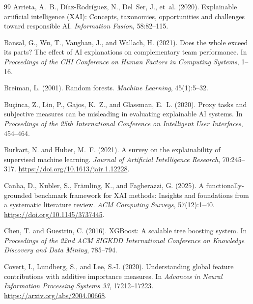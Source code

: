 \documentclass[twoside,11pt]{article}
\begin{document}
\begin{thebibliography}{99}
Arrieta, A.~B., D\'{i}az-Rodr\'{i}guez, N., Del~Ser, J., et~al. (2020).
Explainable artificial intelligence (XAI): Concepts, taxonomies,
opportunities and challenges toward responsible AI.
\emph{Information Fusion}, 58:82--115.

Bansal, G., Wu, T., Vaughan, J., and Wallach, H. (2021).
Does the whole exceed its parts? The effect of AI explanations on
complementary team performance.
In \emph{Proceedings of the CHI Conference on Human Factors in Computing
Systems}, 1--16.

Breiman, L. (2001).
Random forests.
\emph{Machine Learning}, 45(1):5--32.

Bu\c{c}inca, Z., Lin, P., Gajos, K.~Z., and Glassman, E.~L. (2020).
Proxy tasks and subjective measures can be misleading in evaluating
explainable AI systems.
In \emph{Proceedings of the 25th International Conference on Intelligent
User Interfaces}, 454--464.

Burkart, N. and Huber, M.~F. (2021).
A survey on the explainability of supervised machine learning.
\emph{Journal of Artificial Intelligence Research}, 70:245--317.
\url{https://doi.org/10.1613/jair.1.12228}.

Canha, D., Kubler, S., Fr\"{a}mling, K., and Fagherazzi, G. (2025).
A functionally-grounded benchmark framework for XAI methods: Insights
and foundations from a systematic literature review.
\emph{ACM Computing Surveys}, 57(12):1--40.
\url{https://doi.org/10.1145/3737445}.

Chen, T. and Guestrin, C. (2016).
XGBoost: A scalable tree boosting system.
In \emph{Proceedings of the 22nd ACM SIGKDD International Conference on
Knowledge Discovery and Data Mining}, 785--794.

Covert, I., Lundberg, S., and Lee, S.-I. (2020).
Understanding global feature contributions with additive importance
measures.
In \emph{Advances in Neural Information Processing Systems 33},
17212--17223.
\url{https://arxiv.org/abs/2004.00668}.


\end{thebibliography}
\end{document}

